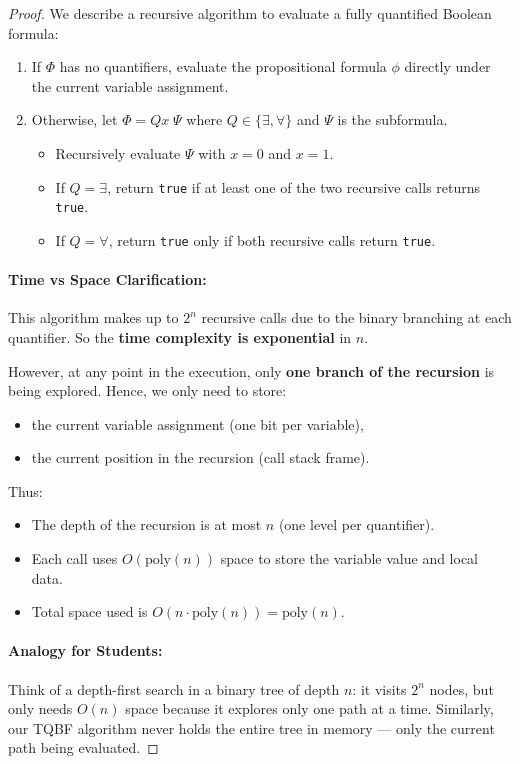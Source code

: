 \begin{proof}
We describe a recursive algorithm to evaluate a fully quantified Boolean formula:

\begin{enumerate}
    \item If $\Phi$ has no quantifiers, evaluate the propositional formula $\phi$ directly under the current variable assignment.
    \item Otherwise, let $\Phi = Qx \; \Psi$ where $Q \in \{\exists, \forall\}$ and $\Psi$ is the subformula.
    \begin{itemize}
        \item Recursively evaluate $\Psi$ with $x = 0$ and $x = 1$.
        \item If $Q = \exists$, return \texttt{true} if at least one of the two recursive calls returns \texttt{true}.
        \item If $Q = \forall$, return \texttt{true} only if both recursive calls return \texttt{true}.
    \end{itemize}
\end{enumerate}

\paragraph{Time vs Space Clarification:}
This algorithm makes up to $2^n$ recursive calls due to the binary branching at each quantifier. So the \textbf{time complexity is exponential} in $n$.

However, at any point in the execution, only \textbf{one branch of the recursion} is being explored. Hence, we only need to store:
\begin{itemize}
    \item the current variable assignment (one bit per variable),
    \item the current position in the recursion (call stack frame).
\end{itemize}

Thus:
\begin{itemize}
    \item The depth of the recursion is at most $n$ (one level per quantifier).
    \item Each call uses $O(\text{poly}(n))$ space to store the variable value and local data.
    \item Total space used is $O(n \cdot \text{poly}(n)) = \text{poly}(n)$.
\end{itemize}

\paragraph{Analogy for Students:} 
Think of a depth-first search in a binary tree of depth $n$: it visits $2^n$ nodes, but only needs $O(n)$ space because it explores only one path at a time. Similarly, our TQBF algorithm never holds the entire tree in memory — only the current path being evaluated.


\end{proof}
